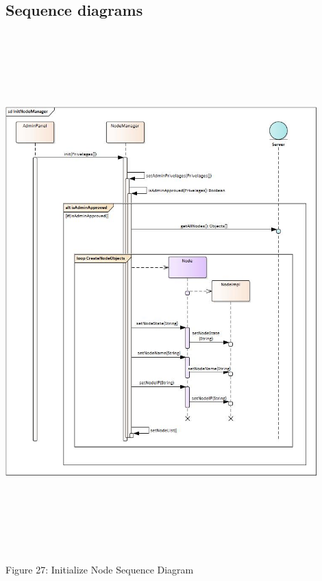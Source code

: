 \subsection{Sequence diagrams}
    \bigskip
    \includegraphics[width=12cm,height=20cm,keepaspectratio]{admin_ui/images/sequence_diagrams/InitNodeManager.jpg}
	\begin{center}
	    \small{Figure 27: Initialize Node Sequence Diagram}
    \end{center}
    
